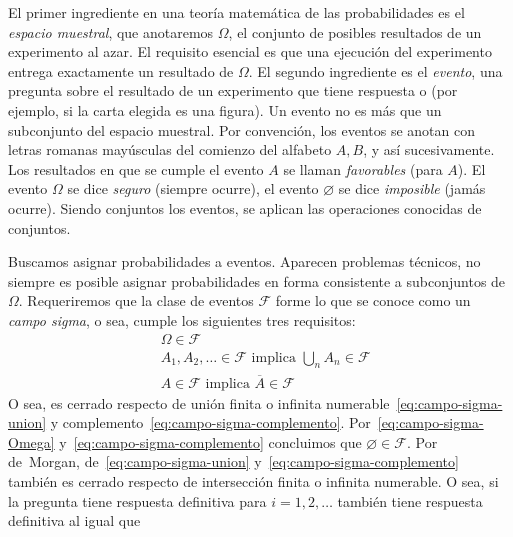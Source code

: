   El primer ingrediente en una teoría matemática de las probabilidades
  es el \emph{espacio muestral},
  que anotaremos \(\Omega\),
  el conjunto de posibles resultados de un experimento al azar.
  El requisito esencial es que una ejecución del experimento
  entrega exactamente un resultado de \(\Omega\).
  El segundo ingrediente es el \emph{evento},
  una pregunta sobre el resultado de un experimento
  que tiene respuesta  o 
  (por ejemplo,
   si la carta elegida es una figura).
  Un evento no es más que un subconjunto del espacio muestral.
  Por convención,
  los eventos se anotan con letras romanas mayúsculas
  del comienzo del alfabeto \(A, B\), y así sucesivamente.
  Los resultados en que se cumple el evento \(A\)
  se llaman \emph{favorables} (para \(A\)).
  El evento \(\Omega\) se dice \emph{seguro}
  (siempre ocurre),
  el evento \(\varnothing\) se dice \emph{imposible}
  (jamás ocurre).
  Siendo conjuntos los eventos,
  se aplican las operaciones conocidas de conjuntos.

  Buscamos asignar probabilidades a eventos.
  Aparecen problemas técnicos,
  no siempre es posible asignar probabilidades en forma consistente
  a subconjuntos de \(\Omega\).
  Requeriremos que la clase de eventos \(\mathscr{F}\)
  forme lo que se conoce como un \emph{campo sigma},
  o sea,
  cumple los siguientes tres requisitos:
  \begin{align}
    &\Omega
       \in \mathscr{F}
           \label{eq:campo-sigma-Omega} \\
    &A_1, A_2, \dotsc
       \in \mathscr{F}
      \text{\ implica\ } \bigcup_n A_n \in \mathscr{F}
           \label{eq:campo-sigma-union} \\
    &A \in \mathscr{F}
      \text{\ implica\ } \overline{A} \in \mathscr{F}
           \label{eq:campo-sigma-complemento}
  \end{align}
  O sea,
  es cerrado respecto de unión finita
  o infinita numerable~\eqref{eq:campo-sigma-union}
  y complemento~\eqref{eq:campo-sigma-complemento}.
  Por~\eqref{eq:campo-sigma-Omega} y~\eqref{eq:campo-sigma-complemento}
  concluimos que \(\varnothing \in \mathscr{F}\).
  Por de~Morgan,
  de~\eqref{eq:campo-sigma-union} y~\eqref{eq:campo-sigma-complemento}
  también es cerrado respecto de intersección finita o infinita numerable.
  O sea,
  si la pregunta 
  tiene respuesta definitiva para \(i = 1, 2, \dotsc\)
  también tiene respuesta definitiva
  al igual que 

